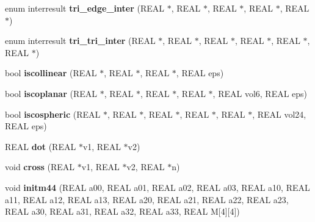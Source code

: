 \begin{DoxyCompactItemize}
enum interresult {\bfseries tri\+\_\+edge\+\_\+inter} (R\+E\+AL $\ast$, R\+E\+AL $\ast$, R\+E\+AL $\ast$, R\+E\+AL $\ast$, R\+E\+AL $\ast$)
\item 
\mbox{\label{classStemMesh3D_1_1tetgenmesh_ab9de338613e7ab6d3b42ce3cd3e77375}} 
enum interresult {\bfseries tri\+\_\+tri\+\_\+inter} (R\+E\+AL $\ast$, R\+E\+AL $\ast$, R\+E\+AL $\ast$, R\+E\+AL $\ast$, R\+E\+AL $\ast$, R\+E\+AL $\ast$)
\item 
\mbox{\label{classStemMesh3D_1_1tetgenmesh_ac66a3fba95508d11d076d6d6aff103f6}} 
bool {\bfseries iscollinear} (R\+E\+AL $\ast$, R\+E\+AL $\ast$, R\+E\+AL $\ast$, R\+E\+AL eps)
\item 
\mbox{\label{classStemMesh3D_1_1tetgenmesh_afcfed433d117877559e90efd1277012a}} 
bool {\bfseries iscoplanar} (R\+E\+AL $\ast$, R\+E\+AL $\ast$, R\+E\+AL $\ast$, R\+E\+AL $\ast$, R\+E\+AL vol6, R\+E\+AL eps)
\item 
\mbox{\label{classStemMesh3D_1_1tetgenmesh_adebd151bade404a018892575ed610445}} 
bool {\bfseries iscospheric} (R\+E\+AL $\ast$, R\+E\+AL $\ast$, R\+E\+AL $\ast$, R\+E\+AL $\ast$, R\+E\+AL $\ast$, R\+E\+AL vol24, R\+E\+AL eps)
\item 
\mbox{\label{classStemMesh3D_1_1tetgenmesh_a603d1023d959ef16fb23f95e07024ad3}} 
R\+E\+AL {\bfseries dot} (R\+E\+AL $\ast$v1, R\+E\+AL $\ast$v2)
\item 
\mbox{\label{classStemMesh3D_1_1tetgenmesh_ab0dde4ba01e9e761e02811f8d8a9126e}} 
void {\bfseries cross} (R\+E\+AL $\ast$v1, R\+E\+AL $\ast$v2, R\+E\+AL $\ast$n)
\item 
\mbox{\label{classStemMesh3D_1_1tetgenmesh_a8c34aaa788493e16630787529e1cd5f2}} 
void {\bfseries initm44} (R\+E\+AL a00, R\+E\+AL a01, R\+E\+AL a02, R\+E\+AL a03, R\+E\+AL a10, R\+E\+AL a11, R\+E\+AL a12, R\+E\+AL a13, R\+E\+AL a20, R\+E\+AL a21, R\+E\+AL a22, R\+E\+AL a23, R\+E\+AL a30, R\+E\+AL a31, R\+E\+AL a32, R\+E\+AL a33, R\+E\+AL M\mbox{[}4\mbox{]}\mbox{[}4\mbox{]})
\item 
\mbox{\label{classStemMesh3D_1_1tetgenmesh_ab41669e8ec20013068e2a1b69774ce50}} 

\end{DoxyCompactItemize}
